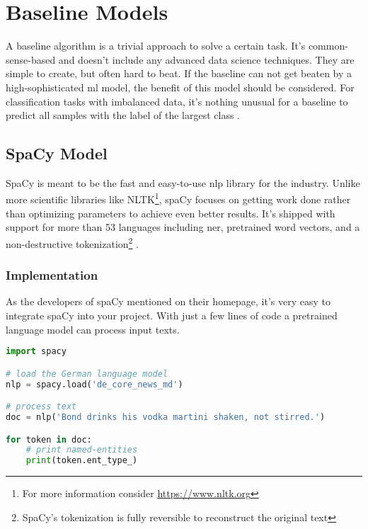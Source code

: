 \chapter{Baseline Models}

A baseline algorithm is a trivial approach to solve a certain task. It's common-sense-based and doesn't include any advanced data science techniques. They are simple to create, but often hard to beat. If the baseline can not get beaten by a high-sophisticated \acrshort{ml} model, the benefit of this model should be considered. For classification tasks with imbalanced data, it's nothing unusual for a baseline to predict all samples with the label of the largest class \cite{rama18}.

\section{SpaCy Model}

SpaCy is meant to be the fast and easy-to-use \acrshort{nlp} library for the industry. Unlike more scientific libraries like NLTK\footnote{For more information consider \url{https://www.nltk.org}}, spaCy focuses on getting work done rather than optimizing parameters to achieve even better results. It's shipped with support for more than 53 languages including \acrlong{ner}, pretrained word vectors, and a non-destructive tokenization\footnote{SpaCy's tokenization is fully reversible to reconstruct the original text} \cite{spacy}.

\subsection{Implementation}

As the developers of spaCy mentioned on their homepage, it's very easy to integrate spaCy into your project. With just a few lines of code a pretrained language model can process input texts.

\begin{lstlisting}[language=Python, label={code:spacy-integration}, caption=Sample of a runnable spaCy model]
import spacy

# load the German language model
nlp = spacy.load('de_core_news_md')

# process text
doc = nlp('Bond drinks his vodka martini shaken, not stirred.')

for token in doc:
    # print named-entities
    print(token.ent_type_)
\end{lstlisting}

